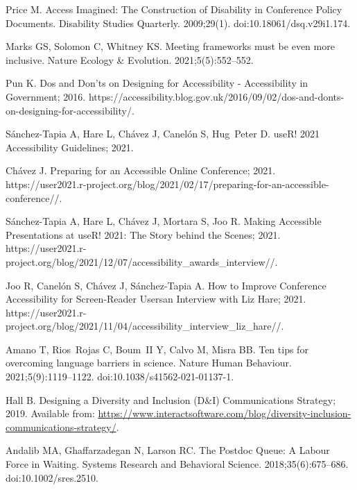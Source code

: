 \documentclass[10pt,letterpaper]{article}
\begin{document}
\begin{thebibliography}{10}
Price M.
\newblock Access {{Imagined}}: The {{Construction}} of {{Disability}} in
  {{Conference Policy Documents}}.
\newblock Disability Studies Quarterly. 2009;29(1).
\newblock doi:{10.18061/dsq.v29i1.174}.

Marks GS, Solomon C, Whitney KS.
\newblock Meeting frameworks must be even more inclusive.
\newblock Nature Ecology \& Evolution. 2021;5(5):552--552.

Pun K. Dos and Don'ts on Designing for Accessibility - {{Accessibility}} in
  Government; 2016.
\newblock
  https://accessibility.blog.gov.uk/2016/09/02/dos-and-donts-on-designing-for-accessibility/.

{S{\'a}nchez-Tapia} A, Hare L, Ch{\'a}vez J, Canel{\'o}n S, Hug~Peter D.
  {{useR}}! 2021 {{Accessibility}} Guidelines; 2021.

Ch{\'a}vez J. Preparing for an {{Accessible Online Conference}}; 2021.
\newblock
  https://user2021.r-project.org/blog/2021/02/17/preparing-for-an-accessible-conference//.

{S{\'a}nchez-Tapia} A, Hare L, Ch{\'a}vez J, Mortara S, Joo R. Making
  Accessible Presentations at {{useR}}! 2021: The Story behind the Scenes;
  2021.
\newblock
  https://user2021.r-project.org/blog/2021/12/07/accessibility\_awards\_interview//.

Joo R, Canel{\'o}n S, Ch{\'a}vez J, {S{\'a}nchez-Tapia} A. How to Improve
  Conference Accessibility for Screen-Reader Users\textemdash an Interview with
  {{Liz Hare}}; 2021.
\newblock
  https://user2021.r-project.org/blog/2021/11/04/accessibility\_interview\_liz\_hare//.

Amano T, Rios~Rojas C, Boum~II Y, Calvo M, Misra BB.
\newblock Ten tips for overcoming language barriers in science.
\newblock Nature Human Behaviour. 2021;5(9):1119--1122.
\newblock doi:{10.1038/s41562-021-01137-1}.

Hall B. Designing a Diversity and Inclusion ({{D}}\&{{I}}) Communications
  Strategy; 2019.
\newblock Available from:
  \url{https://www.interactsoftware.com/blog/diversity-inclusion-communications-strategy/}.

Andalib MA, Ghaffarzadegan N, Larson RC.
\newblock The {{Postdoc Queue}}: A {{Labour Force}} in {{Waiting}}.
\newblock Systems Research and Behavioral Science. 2018;35(6):675--686.
\newblock doi:{10.1002/sres.2510}.


\end{thebibliography}
\end{document}
